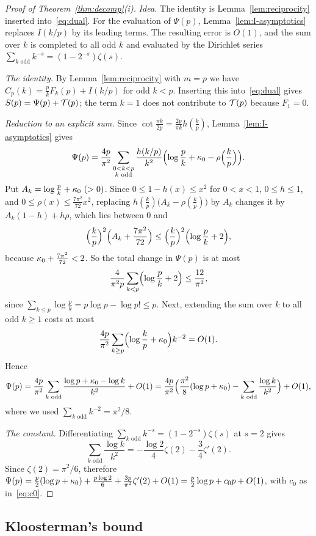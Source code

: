 \begin{proof}[Proof of Theorem~\textup{\ref{thm:decomp}(i)}]
\emph{Idea.} The identity is Lemma~\ref{lem:reciprocity} inserted into~\eqref{eq:dual}. For the evaluation of $\Psi(p)$, Lemma~\ref{lem:I-asymptotics} replaces $I(k/p)$ by its leading terms. The resulting error is $O(1)$, and the sum over $k$ is completed to all odd $k$ and evaluated by the Dirichlet series $\sum_{k\text{ odd}}k^{-s}=(1-2^{-s})\zeta(s)$.

\emph{The identity.} By Lemma~\ref{lem:reciprocity} with $m=p$ we have $C_p(k)=\frac pkF_k(p)+I(k/p)$ for odd $k<p$. Inserting this into~\eqref{eq:dual} gives $S(p)=\Psi(p)+\mathcal{T}(p)$; the term $k=1$ does not contribute to $\mathcal{T}(p)$ because $F_1=0$.

\emph{Reduction to an explicit sum.} Since $\cot\frac{\pi k}{2p}=\frac{2p}{\pi k}h(\frac kp)$, Lemma~\ref{lem:I-asymptotics} gives
\[
\Psi(p)=\frac{4p}{\pi^2}\sum_{\substack{0<k<p\\ k\text{ odd}}}\frac{h(k/p)}{k^2}\Bigl(\log\frac pk+\kappa_0-\rho\Bigl(\frac kp\Bigr)\Bigr).
\]
Put $A_k=\log\frac pk+\kappa_0\ (>0)$. Since $0\le1-h(x)\le x^2$ for $0<x<1$, $0\le h\le1$, and $0\le\rho(x)\le\frac{7\pi^2}{72}x^2$, replacing $h(\frac kp)\bigl(A_k-\rho(\frac kp)\bigr)$ by $A_k$ changes it by $A_k(1-h)+h\rho$, which lies between $0$ and
\[
\Bigl(\frac kp\Bigr)^2\Bigl(A_k+\frac{7\pi^2}{72}\Bigr)\le\Bigl(\frac kp\Bigr)^2\Bigl(\log\frac pk+2\Bigr),
\]
because $\kappa_0+\frac{7\pi^2}{72}<2$. So the total change in $\Psi(p)$ is at most
\[
\frac{4}{\pi^2p}\sum_{k<p}\Bigl(\log\frac pk+2\Bigr)\le\frac{12}{\pi^2},
\]
since $\sum_{k\le p}\log\frac pk=p\log p-\log p!\le p$. Next, extending the sum over $k$ to all odd $k\ge1$ costs at most
\[
\frac{4p}{\pi^2}\sum_{k\ge p}\Bigl(\log\frac kp+\kappa_0\Bigr)k^{-2}=O(1).
\]
Hence
\[
\Psi(p)=\frac{4p}{\pi^2}\sum_{k\text{ odd}}\frac{\log p+\kappa_0-\log k}{k^2}+O(1)=\frac{4p}{\pi^2}\Bigl(\frac{\pi^2}{8}(\log p+\kappa_0)-\sum_{k\text{ odd}}\frac{\log k}{k^2}\Bigr)+O(1),
\]
where we used $\sum_{k\text{ odd}}k^{-2}=\pi^2/8$.

\emph{The constant.} Differentiating $\sum_{k\text{ odd}}k^{-s}=(1-2^{-s})\zeta(s)$ at $s=2$ gives
\[
\sum_{k\text{ odd}}\frac{\log k}{k^2}=-\frac{\log2}{4}\zeta(2)-\frac34\zeta'(2).
\]
Since $\zeta(2)=\pi^2/6$, therefore $\Psi(p)=\frac p2(\log p+\kappa_0)+\frac{p\log2}6+\frac{3p}{\pi^2}\zeta'(2)+O(1)=\frac p2\log p+c_0p+O(1)$, with $c_0$ as in~\eqref{eq:c0}.
\end{proof}

\subsection*{Kloosterman's bound}

